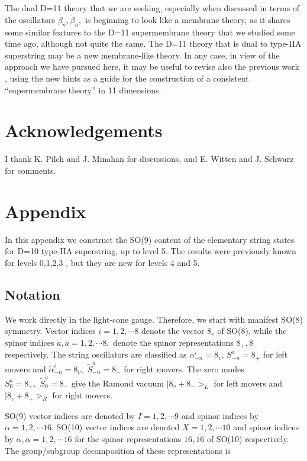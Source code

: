 The dual D=11 theory that we are seeking, especially when discussed in terms
of the oscillators $\beta _n,\tilde \beta _n,$ is beginning to look like a
membrane theory, as it shares some similar features to the D=11
supermembrane theory that we studied some time ago, although not quite the
same. The D=11 theory that is dual to type-IIA superstring may be a new
membrane-like theory. In any case, in view of the approach we have pursued
here, it may be useful to revise also the previous work \cite{ibmembrane}%
\cite{bapose}\cite{ibanomaly}, using the new hints as a guide for the
construction of a consistent ``supermembrane theory'' in 11 dimensions.

\section{Acknowledgements}

I thank K. Pilch and J. Minahan for discussions, and E. Witten and J.
Schwarz for comments.

\section{Appendix}

In this appendix we construct the SO(9) content of the elementary string
states for D=10 type-IIA superstring, up to level 5. The results were
previously known for levels 0,1,2,3 \cite{GSW}, but they are new for levels
4 and 5.

\subsection{Notation}

We work directly in the light-cone gauge. Therefore, we start with manifest
SO(8) symmetry. Vector indices $i=1,2,\cdots 8$ denote the vector $8_v$ of
SO(8), while the spinor indices $a,\dot a=1,2,\cdots 8,$ denote the spinor
representations $8_{+},8_{-}$ respectively. The string oscillators are
classified as $\alpha _{-n}^i=8_v,\,S_{-n}^a=8_{+}$ for left movers and $%
\tilde \alpha _{-n}^i=8_v,\,\,\tilde S_{-n}^{\dot a}=8_{-}$ for right
movers. The zero modes $S_0^a=8_{+},\,\,\tilde S_0^{\dot a}=8_{-}$ give the
Ramond vacuum $|8_v+8_{-}>_L$ for left movers and $|8_v+8_{+}>_R$ for right
movers.

SO(9) vector indices are denoted by $I=1,2,\cdots 9$ and spinor indices by $%
\alpha =1,2,\cdots 16.$ SO(10) vector indices are denoted $X=1,2,\cdots 10$
and spinor indices by $\alpha ,\bar \alpha =1,2,\cdots 16$ for the spinor
representations $16,\overline{16}$ of SO(10) respectively. The
group/subgroup decomposition of these representations is

